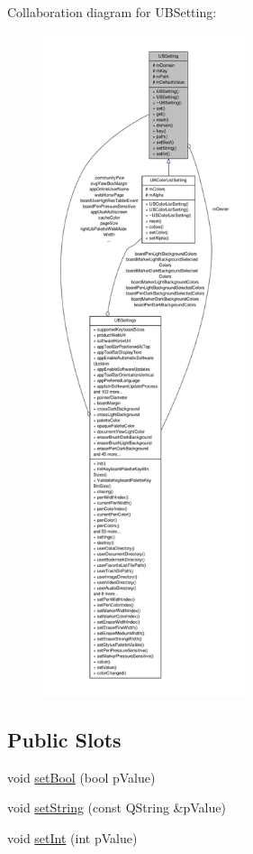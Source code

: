 Collaboration diagram for U\-B\-Setting\-:
\nopagebreak
\begin{figure}[H]
\begin{center}
\leavevmode
\includegraphics[height=550pt]{da/d1a/class_u_b_setting__coll__graph}
\end{center}
\end{figure}
\subsection*{Public Slots}
\begin{DoxyCompactItemize}
\item 
void \hyperlink{class_u_b_setting_ace7b75378f8faad31ab6ce6ea1c7589b}{set\-Bool} (bool p\-Value)
\item 
void \hyperlink{class_u_b_setting_a452bf3be5cee45828397a0b141c9763f}{set\-String} (const Q\-String \&p\-Value)
\item 
void \hyperlink{class_u_b_setting_acac195b0a49f5f5e557495b6c7999c98}{set\-Int} (int p\-Value)
\end{DoxyCompactItemize}
